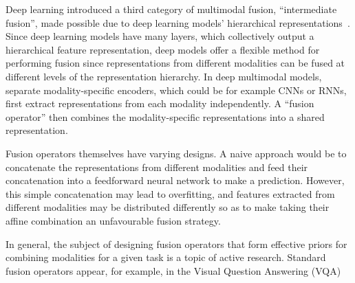 Deep learning introduced a third category of multimodal fusion, ``intermediate
fusion'', made possible due to deep learning models' hierarchical
representations~\cite{ramachandram2017deepmultimodal}.
Since deep learning models have many layers, which collectively output a
hierarchical feature representation, deep models offer a flexible method for
performing fusion since representations from different modalities can be fused
at different levels of the representation hierarchy.
In deep multimodal models, separate modality-specific encoders, which could be
for example CNNs or RNNs, first extract representations from each modality
independently.
A ``fusion operator'' then combines the modality-specific representations into
a shared representation.

Fusion operators themselves have varying designs. A naive approach would be to
concatenate the representations from different modalities and feed their
concatenation into a feedforward neural network to make a prediction.
However, this simple concatenation may lead to overfitting, and features
extracted from different modalities may be distributed differently so as to
make taking their affine combination an unfavourable fusion strategy.

In general, the subject of designing fusion operators that form effective
priors for combining modalities for a given task is a topic of active research.
Standard fusion operators appear, for example, in the Visual Question Answering
(VQA)

